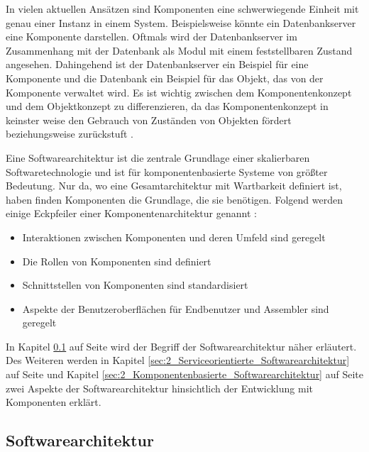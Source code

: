 In vielen aktuellen Ansätzen sind Komponenten eine schwerwiegende Einheit mit genau einer Instanz in einem System. Beispielsweise könnte ein Datenbankserver eine Komponente darstellen. Oftmals wird der Datenbankserver im Zusammenhang mit der Datenbank als Modul mit einem feststellbaren Zustand angesehen. Dahingehend ist der Datenbankserver ein Beispiel für eine Komponente und die Datenbank ein Beispiel für das Objekt, das von der Komponente verwaltet wird. Es ist wichtig zwischen dem Komponentenkonzept und dem Objektkonzept zu differenzieren, da das Komponentenkonzept in keinster weise den Gebrauch von Zuständen von Objekten fördert beziehungsweise zurückstuft \citereset \autocite{Szyperski.2002}.

Eine Softwarearchitektur ist die zentrale Grundlage einer skalierbaren Softwaretechnologie und ist für komponentenbasierte Systeme von größter Bedeutung. Nur da, wo eine Gesamtarchitektur mit Wartbarkeit definiert ist, haben finden Komponenten die Grundlage, die sie benötigen. Folgend werden einige Eckpfeiler einer Komponentenarchitektur genannt \citereset \autocite{Szyperski.2002}:
\begin{itemize}
\item Interaktionen zwischen Komponenten und deren Umfeld sind geregelt
\item Die Rollen von Komponenten sind definiert
\item Schnittstellen von Komponenten sind standardisiert
\item Aspekte der Benutzeroberflächen für Endbenutzer und Assembler sind geregelt
\end{itemize}
In Kapitel \ref{sec:2_Softwarearchitektur} auf Seite \pageref{sec:2_Softwarearchitektur} wird der Begriff der Softwarearchitektur näher erläutert. Des Weiteren werden in Kapitel \ref{sec:2_Serviceorientierte_Softwarearchitektur} auf Seite \pageref{sec:2_Serviceorientierte_Softwarearchitektur} und Kapitel \ref{sec:2_Komponentenbasierte_Softwarearchitektur} auf Seite \pageref{sec:2_Komponentenbasierte_Softwarearchitektur} zwei Aspekte der Softwarearchitektur hinsichtlich der Entwicklung mit Komponenten erklärt.

\subsection{Softwarearchitektur}
\label{sec:2_Softwarearchitektur}

